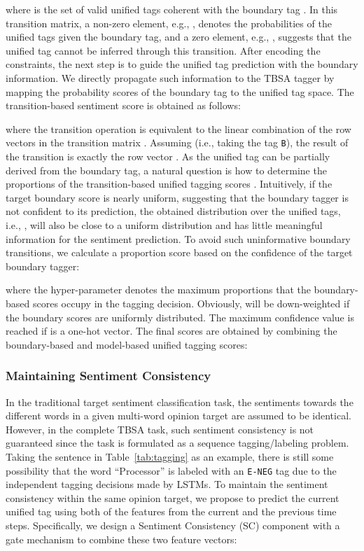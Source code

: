 \documentclass[letterpaper]{article} \usepackage{aaai19}  \usepackage{times}  \usepackage{helvet}  \usepackage{courier}  \usepackage{url}  \usepackage{graphicx}  \frenchspacing  \setlength{\pdfpagewidth}{8.5in}  \setlength{\pdfpageheight}{11in}
\begin{document}
where  is the set of valid unified tags coherent with the boundary tag . In this transition matrix, a non-zero element, e.g., , denotes the probabilities of the unified tags given the boundary tag, and a zero element, e.g., , suggests that the unified tag cannot be inferred through this transition. After encoding the constraints, the next step is to guide the unified tag prediction with the boundary information. We directly propagate such information to the TBSA tagger by mapping the probability scores of the boundary tag  to the unified tag space. The transition-based sentiment score  is obtained as follows:

where the transition operation is equivalent to the linear combination of the row vectors in the transition matrix . Assuming  (i.e., taking the tag \texttt{B}), the result of the transition is exactly the row vector . As the unified tag can be partially derived from the boundary tag, a natural question is how to determine the proportions of the transition-based unified tagging scores . Intuitively, if the target boundary score  is nearly uniform, suggesting that the boundary tagger is not confident to its prediction, the obtained distribution over the unified tags, i.e., , will also be close to a uniform distribution and has little meaningful information for the sentiment prediction. To avoid such uninformative boundary transitions, we calculate a proportion score  based on the confidence  of the target boundary tagger:

where the hyper-parameter  denotes the maximum proportions that the boundary-based scores  occupy in the tagging decision. Obviously,  will be down-weighted if the boundary scores are uniformly distributed. The maximum confidence value is reached if  is a one-hot vector. The final scores are obtained by combining the boundary-based and model-based unified tagging scores:



\subsubsection{Maintaining Sentiment Consistency} 
In the traditional target sentiment classification task, the sentiments towards the different words in a given multi-word opinion target are assumed to be identical. However, in the complete TBSA task, such sentiment consistency is not guaranteed since the task is formulated as a sequence tagging/labeling problem. Taking the sentence in Table~\ref{tab:tagging} as an example, there is still some possibility that the word ``Processor'' is labeled with an \texttt{E-NEG} tag due to the independent tagging decisions made by LSTMs. To maintain the sentiment consistency within the same opinion target, we propose to predict the current unified tag using both of the features from the current and the previous time steps. Specifically, we design a Sentiment Consistency (SC) component with a gate mechanism to combine these two feature vectors:
\end{document}
